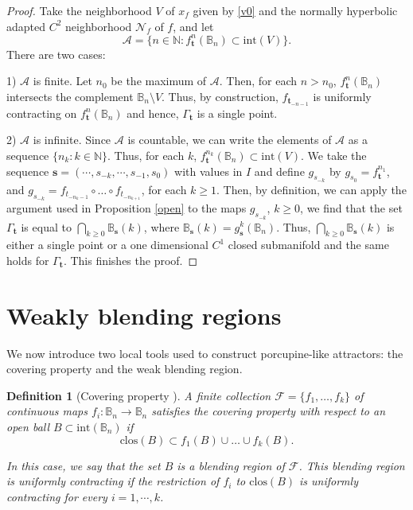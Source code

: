 \documentclass[11pt,reqno]{amsart}
\theoremstyle{plain}
\newtheorem{definition}[theorem]{Definition}
\newtheorem*{theorem A}{Theorem A}
\newtheorem*{theorem B}{Theorem B}
\newtheorem*{theorem C}{Theorem C}
\newtheorem*{theorem 1}{Theorem 1}
\newtheorem*{theorem 2}{Theorem 2}
\newtheorem*{theorem 3}{Theorem 3}
\numberwithin{equation}{section}
\begin{document}
\begin{proof}
Take the neighborhood $V$ of $x_f$ given by \eqref{v0} and the normally hyperbolic adapted $C^2$ neighborhood $\mathcal{N}_f$ of $f$, and let
\begin{equation*}
\mathcal{A}=\{n \in \mathbb{N}: f_{\mathbf{t}}^{n} (\mathbb{B}_n) \subset \mathrm{int}(V)\}.
\end{equation*}
There are two cases:

1) $\mathcal{A}$ is finite. Let $n_0$ be the maximum of $\mathcal{A}$. Then, for each $n > n_0$, $f_{\mathbf{t}}^{n} (\mathbb{B}_n)$ intersects the complement $\mathbb{B}_n \setminus V$. Thus, by construction, $f_{\textbf{t}_{-n-1}}$ is uniformly contracting on $f_{\mathbf{t}}^{n} (\mathbb{B}_n)$ and hence, $\Gamma_{\mathbf{t}}$ is a single point.

2) $\mathcal{A}$ is infinite. Since $\mathcal{A}$ is countable, we can write the elements of $\mathcal{A}$ as a sequence $\{n_k: k \in \mathbb{N}\}$.
Thus, for each $k$, $f_{\mathbf{t}}^{n_k} (\mathbb{B}_n)\subset \mathrm{int}(V)$.
We take the sequence $\mathbf{s}=(\cdots, s_{-k}, \cdots, s_{-1}, s_0)$ with values in $I$ and define $g_{s_{-k}}$ by $g_{s_0}=f_{\mathbf{t}}^{n_1}$, and $g_{s_{-k}}=f_{t_{-n_k -1}}\circ \dots \circ f_{t_{-n_{k +1}}}$, for each $k \geq 1$.
Then, by definition, we can apply the argument used in Proposition \ref{open} to the maps $g_{s_{-k}}$, $k\geq 0$, we find that the set $\Gamma_{\mathbf{t}}$ is equal to $\bigcap_{k\ge 0}\mathbb{B}_{\mathbf{s}} (k)$, where $\mathbb{B}_{\mathbf{s}} (k) = g^k_{\mathbf{s}} (\mathbb{B}_{n})$.
Thus, $\bigcap_{k\ge 0}\mathbb{B}_{\mathbf{s}} (k)$ is either a single point or a one dimensional $C^1$ closed submanifold and the same holds for $\Gamma_{\mathbf{t}}$.
This finishes the proof.
\end{proof}








\section{Weakly blending regions}\label{wbr}

We now introduce two local tools used to construct porcupine-like attractors: the covering property and the weak blending region.

\begin{definition}[Covering property \cite{nassiri2012robust}]\label{covering}
A finite collection $\mathcal{F}=\{f_1, \ldots, f_k\}$ of continuous maps $f_i \colon \mathbb{B}_n \to \mathbb{B}_n$ satisfies the \emph{covering property} with respect to an open ball $B \subset \mathrm{int}(\mathbb{B}_n)$ if
$$
\mathrm{clos}(B)\subset f_1(B)\cup \ldots \cup f_k(B).
$$

In this case, we say that the set $B$ is a \emph{blending region of $\mathcal{F}$}. This blending region is \emph{uniformly contracting} if the restriction of $f_i$ to $\mathrm{clos}(B)$ is uniformly contracting for every $i = 1, \cdots, k$.
\end{definition}
\end{document}
